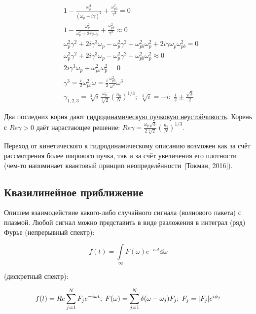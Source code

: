 \documentclass[10pt, a4paper]{article}
\newcommand{\Tokman}{~[Токман, 2016]}
\begin{document}
\begin{align*}
	&1 - \frac{\omega_p^2}{(\omega_p+i\gamma)^2} + \frac{\omega_{pb}^2}{\gamma^2} = 0 \\
	&1 - \frac{\omega_p^2}{\omega_p^2 + 2i\gamma\omega_p} + \frac{\omega_{pb}^2}{\gamma^2} \approx 0 \\
	&\omega_p^2\gamma^2 + 2i\gamma^3\omega_p-\omega_p^2\gamma^2 + \omega_{pb}^2\omega_p^2 + 2i\gamma\omega_p\omega_{pb}^2 = 0 \\
	&\omega_p^2\gamma^2 + 2i\gamma^3\omega_p-\omega_p^2\gamma^2 + \omega_{pb}^2\omega_p^2 \approx 0 \\
	&2i\gamma^3\omega_p + \omega_{pb}^2\omega_p^2 = 0 \\
	&\gamma^3 = \frac{i}{2} \omega_{pb}^2\omega = \frac{i}{2} \frac{\omega_{pb}^2}{\omega^2}\omega^3 \\
	&\gamma_{1,2,3} = \sqrt[3]{i} \frac{\omega_p}{\sqrt[3]{2}}\left(\frac{n_b}{N}\right)^{1/3};\;\sqrt[3]{i} = -i;\;\frac{i}{2}\pm\frac{\sqrt{3}}{2}
\end{align*}

Два последних корня дают \uline{гидродинамическую пучковую неустойчивость}. Корень с $Re\gamma>0$ даёт нарастающее решение: $Re\gamma = \frac{\omega_p\sqrt{3}}{2\sqrt[3]{2}}\left(\frac{n_b}{N}\right)^{1/3}$.

Переход от кинетического к гидродинамическому описанию возможен как за счёт рассмотрения более широкого пучка, так и за счёт увеличения его плотности (чем-то напоминает квантовый принцип неопределённости\Tokman).	

\subsection{Квазилинейное приближение}

Опишем взаимодействие какого-либо случайного сигнала (волнового пакета) с плазмой. Любой сигнал можно представить в виде разложения в интеграл (ряд) Фурье (непрерывный спектр):

\begin{equation*}
	f(t) = \int\limits_\infty F(\omega)e^{-i\omega t}\dd{\omega}
\end{equation*}

(дискретный спектр):

\begin{equation*}
	f(t) = Re\sum\limits_{j=1}^N F_je^{-i\omega t};\;F(\omega) = \sum\limits_{j=1}^N \delta(\omega-\omega_j)F_j;\;F_j = \abs{F_j}e^{i\phi_j}
\end{equation*}
\end{document}

